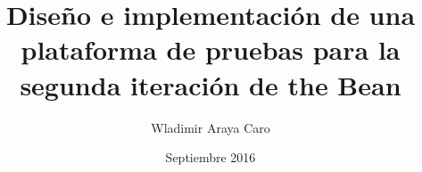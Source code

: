 \documentclass[pucformat,spanish]{XPucThesis}
\begin{document}
\version{\today}

\title[TITLE]{\textbf{Diseño e implementación de una plataforma de pruebas para la segunda iteración de the Bean}}
\author[AUTOR]{Wladimir Araya Caro}
\address{Escuela de Ingenier\'ia\\
         Pontificia Universidad Cat\'olica de Chile\\ 
         Vicu\~na Mackenna 4860\\
         Santiago, Chile\\
         {\it Tel.\/} : 56 (2) 354-2000}

\advisorB{} %


\subject{Engineering}

\date{Septiembre 2016} %


\dedication{\mbox{}}

\NoChapterPageNumber    %

\maketitle

\cleardoublepage

\end{document}
